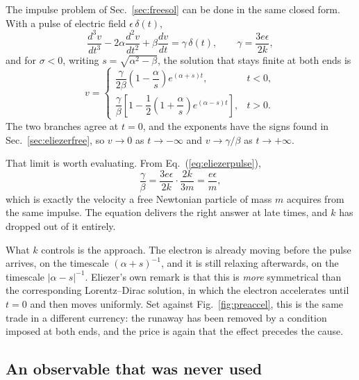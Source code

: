 \documentclass[preprint]{aastex701}
\begin{document}
The impulse problem of Sec.~\ref{sec:freesol} can be done in the same closed
form. With a pulse of electric field $\epsilon\,\delta(t)$,
\begin{equation}
\frac{d^3v}{dt^3} - 2\alpha\frac{d^2v}{dt^2} + \beta\frac{dv}{dt}
= \gamma\,\delta(t),
\qquad \gamma = \frac{3e\epsilon}{2k},
\label{eq:eliezerpulse}
\end{equation}
and for $\sigma<0$, writing $s=\sqrt{\alpha^2-\beta}$, the solution that stays
finite at both ends is
\begin{equation}
v =
\begin{cases}
\dfrac{\gamma}{2\beta}\left(1-\dfrac{\alpha}{s}\right)
e^{(\alpha+s)t}, & t<0,\\[10pt]
\dfrac{\gamma}{\beta}\left[1-\dfrac12\left(1+\dfrac{\alpha}{s}\right)
e^{(\alpha-s)t}\right], & t>0.
\end{cases}
\label{eq:pulsesol}
\end{equation}
The two branches agree at $t=0$, and the exponents have the signs found in
Sec.~\ref{sec:eliezerfree}, so $v\to0$ as $t\to-\infty$ and
$v\to\gamma/\beta$ as $t\to+\infty$.

That limit is worth evaluating. From Eq.~(\ref{eq:eliezerpulse}),
\begin{equation}
\frac{\gamma}{\beta} = \frac{3e\epsilon}{2k}\cdot\frac{2k}{3m}
= \frac{e\epsilon}{m},
\label{eq:finalv}
\end{equation}
which is exactly the velocity a free Newtonian particle of mass $m$ acquires
from the same impulse. The equation delivers the right answer at late times,
and $k$ has dropped out of it entirely.

What $k$ controls is the approach. The electron is already moving before the
pulse arrives, on the timescale $(\alpha+s)^{-1}$, and it is still relaxing
afterwards, on the timescale $|\alpha-s|^{-1}$. Eliezer's own remark is that
this is \emph{more} symmetrical than the corresponding Lorentz--Dirac solution,
in which the electron accelerates until $t=0$ and then moves uniformly. Set
against Fig.~\ref{fig:preaccel}, this is the same trade in a different currency:
the runaway has been removed by a condition imposed at both ends, and the price
is again that the effect precedes the cause.

\subsection{An observable that was never used}
\label{sec:eliezerspectrum}
\end{document}
